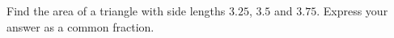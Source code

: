 Find the area of a triangle with side lengths $3.25$, $3.5$ and $3.75$. Express your answer as a common fraction.
